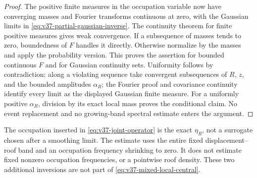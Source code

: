 \begin{proof}
The positive finite measures in the occupation variable now have
converging masses and Fourier transforms continuous at zero, with
the Gaussian limits in \eqref{eq:v37-partial-gaussian-inverse}.
The continuity theorem for finite positive measures gives weak
convergence. If a subsequence of masses tends to zero, boundedness of
$F$ handles it directly. Otherwise normalize by the masses and apply
the probability version. This proves the assertion for bounded
continuous $F$ and for Gaussian continuity sets. Uniformity follows
by contradiction: along a violating sequence take convergent
subsequences of $R$, $z$, and the bounded amplitudes $\alpha_R$;
the Fourier proof and covariance continuity identify every limit as
the displayed Gaussian finite measure. For a uniformly positive
$\alpha_R$, division by its exact local mass proves the conditional
claim. No event replacement and no growing-band spectral estimate
enters the argument.
\end{proof}

\begin{remark}
The occupation inserted in \eqref{eq:v37-joint-operator} is the exact
$\eta_R$, not a surrogate chosen after a smoothing limit. The estimate
uses the entire fixed displacement--roof band and an occupation
frequency shrinking to zero. It does not estimate fixed nonzero
occupation frequencies, or a pointwise roof density. These two
additional inversions are not part of
\eqref{eq:v37-mixed-local-central}.
\end{remark}
